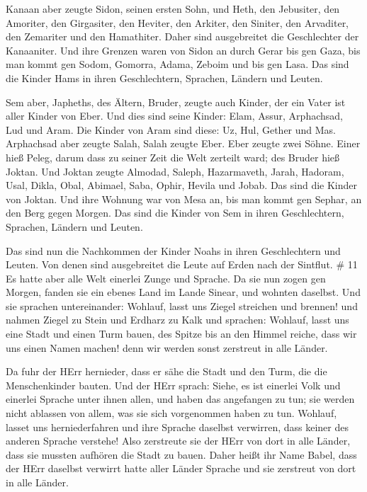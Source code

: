  Kanaan aber zeugte Sidon, seinen ersten Sohn, und Heth,
 den Jebusiter, den Amoriter, den Girgasiter, 
den Heviter, den Arkiter, den Siniter,  den Arvaditer, den
Zemariter und den Hamathiter. Daher sind ausgebreitet die Geschlechter
der Kanaaniter.  Und ihre Grenzen waren von Sidon an durch
Gerar bis gen Gaza, bis man kommt gen Sodom, Gomorra, Adama, Zeboim und
bis gen Lasa.  Das sind die Kinder Hams in ihren
Geschlechtern, Sprachen, Ländern und Leuten.

 Sem aber, Japheths, des Ältern, Bruder, zeugte auch
Kinder, der ein Vater ist aller Kinder von Eber.  Und dies
sind seine Kinder: Elam, Assur, Arphachsad, Lud und Aram. 
Die Kinder von Aram sind diese: Uz, Hul, Gether und Mas. 
Arphachsad aber zeugte Salah, Salah zeugte Eber.  Eber
zeugte zwei Söhne. Einer hieß Peleg, darum dass zu seiner Zeit die Welt
zerteilt ward; des Bruder hieß Joktan.  Und Joktan zeugte
Almodad, Saleph, Hazarmaveth, Jarah,  Hadoram, Usal, Dikla,
 Obal, Abimael, Saba,  Ophir, Hevila und
Jobab. Das sind die Kinder von Joktan.  Und ihre Wohnung
war von Mesa an, bis man kommt gen Sephar, an den Berg gegen Morgen.
 Das sind die Kinder von Sem in ihren Geschlechtern,
Sprachen, Ländern und Leuten.

 Das sind nun die Nachkommen der Kinder Noahs in ihren
Geschlechtern und Leuten. Von denen sind ausgebreitet die Leute auf
Erden nach der Sintflut. \# 11  Es hatte aber alle Welt
einerlei Zunge und Sprache.  Da sie nun zogen gen Morgen,
fanden sie ein ebenes Land im Lande Sinear, und wohnten daselbst.
 Und sie sprachen untereinander: Wohlauf, lasst uns Ziegel
streichen und brennen! und nahmen Ziegel zu Stein und Erdharz zu Kalk
 und sprachen: Wohlauf, lasst uns eine Stadt und einen Turm
bauen, des Spitze bis an den Himmel reiche, dass wir uns einen Namen
machen! denn wir werden sonst zerstreut in alle Länder.

 Da fuhr der HErr hernieder, dass er sähe die Stadt und den
Turm, die die Menschenkinder bauten.  Und der HErr sprach:
Siehe, es ist einerlei Volk und einerlei Sprache unter ihnen allen, und
haben das angefangen zu tun; sie werden nicht ablassen von allem, was
sie sich vorgenommen haben zu tun.  Wohlauf, lasset uns
herniederfahren und ihre Sprache daselbst verwirren, dass keiner des
anderen Sprache verstehe!  Also zerstreute sie der HErr von
dort in alle Länder, dass sie mussten aufhören die Stadt zu bauen.
 Daher heißt ihr Name Babel, dass der HErr daselbst verwirrt
hatte aller Länder Sprache und sie zerstreut von dort in alle Länder.

